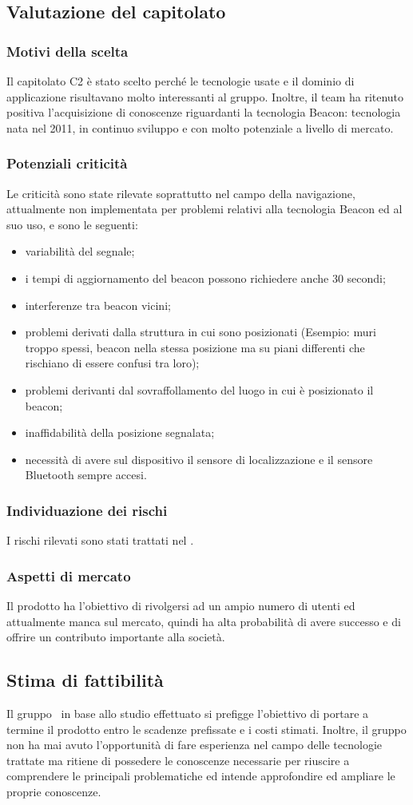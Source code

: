\documentclass[../StudioDiFattibilita.tex]{subfiles}
\begin{document}
	\subsection{Valutazione del capitolato}
		\subsubsection{Motivi della scelta}
		Il capitolato C2 è stato scelto perché le tecnologie usate e il dominio di applicazione risultavano molto interessanti al gruppo.
		Inoltre, il team ha ritenuto positiva l'acquisizione di conoscenze riguardanti la tecnologia Beacon: tecnologia nata nel 2011, in continuo sviluppo e con molto potenziale a livello di mercato.
		\subsubsection{Potenziali criticità}
		Le criticità sono state rilevate soprattutto nel campo della navigazione, attualmente non implementata per problemi relativi alla tecnologia Beacon ed al suo uso, e sono le seguenti:
			\begin{itemize}
				\item variabilità del segnale;
				\item i tempi di aggiornamento del beacon possono richiedere anche 30 secondi;
				\item interferenze tra beacon vicini;
				\item problemi derivati dalla struttura in cui sono posizionati (Esempio: muri troppo spessi, beacon nella stessa posizione ma su piani differenti che rischiano di essere confusi tra loro);
				\item problemi derivanti dal sovraffollamento del luogo in cui è posizionato il beacon;
				\item inaffidabilità della posizione segnalata;
				\item necessità di avere sul dispositivo il sensore di localizzazione e il sensore Bluetooth sempre accesi.
			\end{itemize}
		\subsubsection{Individuazione dei rischi}
		I rischi rilevati sono stati trattati nel \pianodiprogettov.
		\subsubsection{Aspetti di mercato}
		Il prodotto ha l'obiettivo di rivolgersi ad un ampio numero di utenti ed attualmente manca sul mercato, quindi ha alta probabilità di avere successo e di offrire un contributo importante alla società.
	\subsection{Stima di fattibilità}
	Il gruppo \leaf\ in base allo studio effettuato si prefigge l'obiettivo di portare a termine il prodotto entro le scadenze prefissate e i costi stimati.
	Inoltre, il gruppo non ha mai avuto l'opportunità di fare esperienza nel campo delle tecnologie trattate ma ritiene di possedere le conoscenze necessarie per riuscire a comprendere le principali problematiche ed intende approfondire ed ampliare le proprie conoscenze.
\end{document}
